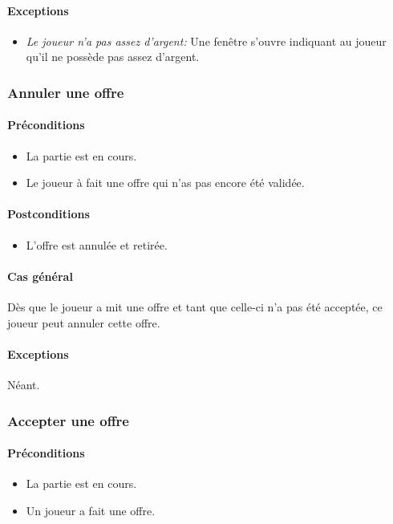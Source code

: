 \documentclass[a4paper,11pt]{report}
\begin{document}
\paragraph{Exceptions}
\begin{itemize}
 \item \textit{Le joueur n'a pas assez d'argent:} Une fenêtre s'ouvre indiquant au joueur qu'il ne possède pas assez d'argent.
\end{itemize}

\subsubsection{Annuler une offre}
\paragraph{Préconditions}
\begin{itemize}
 \item La partie est en cours.
 \item Le joueur à fait une offre qui n'as pas encore été validée.
\end{itemize}
\paragraph{Postconditions}
\begin{itemize}
 \item L'offre est annulée et retirée.
\end{itemize}
\paragraph{Cas général}
Dès que le joueur a mit une offre et tant que celle-ci n'a pas été acceptée, ce joueur peut annuler cette offre.
\paragraph{Exceptions} Néant.

\subsubsection{Accepter une offre}
\paragraph{Préconditions}
\begin{itemize}
 \item La partie est en cours.
 \item Un joueur a fait une offre.
\end{itemize}
\end{document}
